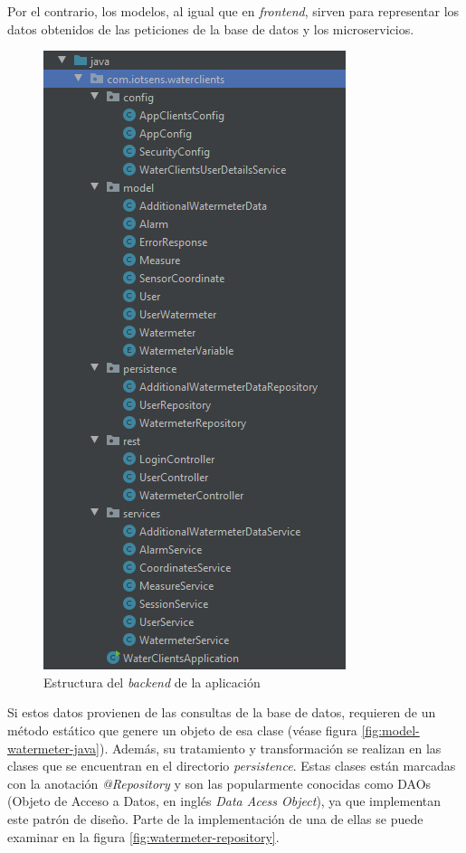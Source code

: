 \documentclass[pdftex,11pt,a4paper]{book}
\begin{document}
Por el contrario, los modelos, al igual que en \textit{frontend}, sirven para representar los datos obtenidos de las peticiones de la base de datos y los microservicios.

\begin{figure}[H]
 \centering
 \includegraphics [scale=1] {images/implementacion/estructura-backend.png}
 \caption{Estructura del \textit{backend} de la aplicación} \label{fig:estructura-backend}
 \end{figure}


Si estos datos provienen de las consultas de la base de datos, requieren de un método estático que genere un objeto de esa clase (véase figura \ref{fig:model-watermeter-java}). Además, su tratamiento y transformación se realizan en las clases que se encuentran en el directorio \textit{persistence}. Estas clases están marcadas con la anotación \textit{@Repository} y son las popularmente conocidas como DAOs (Objeto de Acceso a Datos, en inglés \textit{Data Acess Object}), ya que implementan este patrón de diseño. Parte de la implementación de una de ellas se puede examinar en la figura \ref{fig:watermeter-repository}. 
\end{document}
